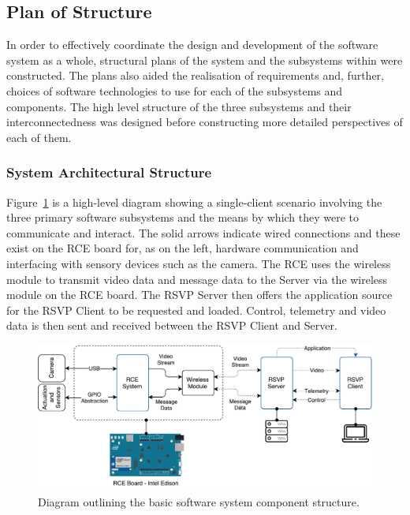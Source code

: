   \subsection{Plan of Structure}
    In order to effectively coordinate the design and development of the software system as a whole, structural plans of the system and the subsystems within were constructed. The plans also aided the realisation of requirements and, further, choices of software technologies to use for each of the subsystems and components. The high level structure of the three subsystems and their interconnectedness was designed before constructing more detailed perspectives of each of them.
    
    \subsubsection{System Architectural Structure}            
      Figure~\ref{fig:softDesign-sysArchitectureStructure} is a high-level diagram showing a single-client scenario involving the three primary software subsystems and the means by which they were to communicate and interact. The solid arrows indicate wired connections and these exist on the RCE board for, as on the left, hardware communication and interfacing with sensory devices such as the camera. The RCE uses the wireless module to transmit video data and message data to the Server via the wireless module on the RCE board. The RSVP Server then offers the application source for the RSVP Client to be requested and loaded. Control, telemetry and video data is then sent and received between the RSVP Client and Server.

      \begin{figure}[h!]
        \centering
        \includegraphics[width=1\linewidth]{figures/softDesign-sysArchitectureStructure}
        \caption[Diagram outlining the basic software system component structure.]{Diagram outlining the basic software system component structure.}
        \label{fig:softDesign-sysArchitectureStructure}
      \end{figure}
      
